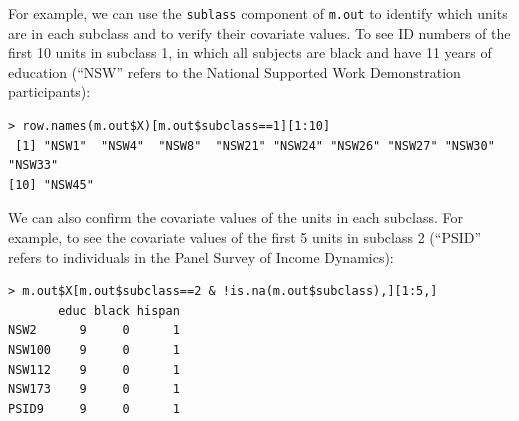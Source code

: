 \documentclass[oneside,letterpaper,titlepage]{article}
\begin{document}
For example, we can use the {\tt sublass} component of {\tt m.out} to
identify which units are in each subclass and to verify their
covariate values.  To see ID numbers of the first 10 units in subclass
1, in which all subjects are black and have 11 years of education
(``NSW'' refers to the National Supported Work Demonstration
participants):
\begin{verbatim}
> row.names(m.out$X)[m.out$subclass==1][1:10]
 [1] "NSW1"  "NSW4"  "NSW8"  "NSW21" "NSW24" "NSW26" "NSW27" "NSW30" "NSW33"
[10] "NSW45"
\end{verbatim}
We can also confirm the covariate values of the units in each
subclass.  For example, to see the covariate values of the first 5
units in subclass 2 (``PSID'' refers to individuals in the Panel
Survey of Income Dynamics):
\begin{verbatim}
> m.out$X[m.out$subclass==2 & !is.na(m.out$subclass),][1:5,]
       educ black hispan
NSW2      9     0      1
NSW100    9     0      1
NSW112    9     0      1
NSW173    9     0      1
PSID9     9     0      1
\end{verbatim}
\end{document}
